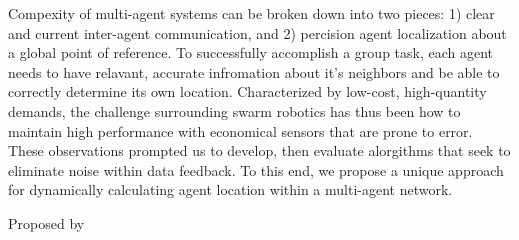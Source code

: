 Compexity of multi-agent systems can be broken down into two pieces: 1) clear and current inter-agent communication, and 2) percision agent localization about a global point of reference. To successfully accomplish a group task, each agent needs to have relavant, accurate infromation about it's neighbors and be able to correctly determine its own location. Characterized by low-cost, high-quantity demands, the challenge surrounding swarm robotics has thus been how to maintain high performance with economical sensors that are prone to error. These observations prompted us to develop, then evaluate alorgithms that seek to eliminate noise within data feedback. To this end, we propose a unique approach for dynamically calculating agent location within a multi-agent network.

Proposed by \cite{becker2009analyzing}